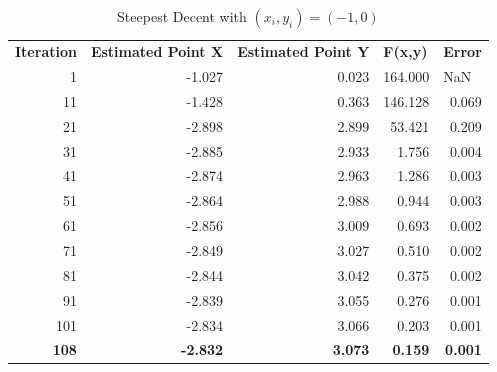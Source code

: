 \documentclass[12pt]{article}
\begin{document}
\begin{table}[h!]
  \centering
  \caption{Steepest Decent with $(x_i,y_i) = (-1,0)$}
    \begin{tabular}{rrrrr}
    \multicolumn{1}{l}{\textbf{Iteration}} & \multicolumn{1}{l}{\textbf{Estimated Point X}} & \multicolumn{1}{l}{\textbf{Estimated Point Y}} & \multicolumn{1}{l}{\textbf{F(x,y)}} & \multicolumn{1}{l}{\textbf{Error}} \\
    1     & -1.027 & 0.023 & 164.000 & \multicolumn{1}{l}{NaN} \\
    11    & -1.428 & 0.363 & 146.128 & 0.069 \\
    21    & -2.898 & 2.899 & 53.421 & 0.209 \\
    31    & -2.885 & 2.933 & 1.756 & 0.004 \\
    41    & -2.874 & 2.963 & 1.286 & 0.003 \\
    51    & -2.864 & 2.988 & 0.944 & 0.003 \\
    61    & -2.856 & 3.009 & 0.693 & 0.002 \\
    71    & -2.849 & 3.027 & 0.510 & 0.002 \\
    81    & -2.844 & 3.042 & 0.375 & 0.002 \\
    91    & -2.839 & 3.055 & 0.276 & 0.001 \\
    101   & -2.834 & 3.066 & 0.203 & 0.001 \\
    \textbf{108} & \textbf{-2.832} & \textbf{3.073} & \textbf{0.159} & \textbf{0.001} \\
    \end{tabular}%
  \label{tab:SDM_gess2}%
\end{table}%
\end{document}
